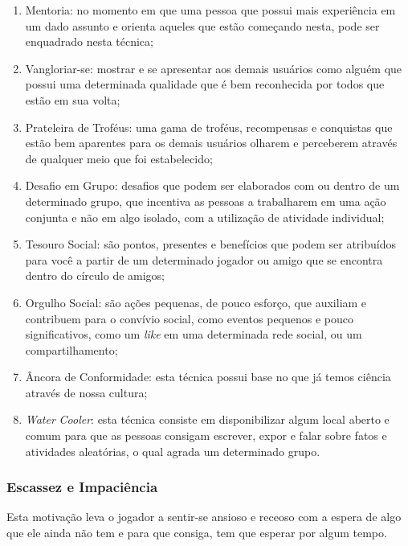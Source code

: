 \begin{enumerate}
    \item Mentoria: no momento em que uma pessoa que possui mais experiência
        em um dado assunto e orienta aqueles que estão começando nesta, pode
        ser enquadrado nesta técnica;
    \item Vangloriar-se: mostrar e se apresentar aos demais usuários como
        alguém que possui uma determinada qualidade que é bem reconhecida
        por todos que estão em sua volta;
    \item Prateleira de Troféus: uma gama de troféus, recompensas e conquistas
        que estão bem aparentes para os demais usuários olharem e perceberem
        através de qualquer meio que foi estabelecido;
    \item Desafio em Grupo: desafios que podem ser elaborados com ou dentro
        de um determinado grupo, que incentiva as pessoas a trabalharem
        em uma ação conjunta e não em algo isolado, com a utilização de atividade
        individual;
    \item Tesouro Social: são pontos, presentes e benefícios que podem ser atribuídos
        para você a partir de um determinado jogador ou amigo que se encontra dentro
        do círculo de amigos;
    \item Orgulho Social:  são ações pequenas, de pouco esforço, que auxiliam e contribuem
        para o convívio social, como eventos pequenos e pouco significativos,
        como um \textit{like} em uma determinada rede social, ou um compartilhamento;
    \item Âncora de Conformidade: esta técnica possui base no que já temos ciência
        através de nossa cultura;
    \item \textit{Water} \textit{Cooler}: esta técnica consiste em disponibilizar algum local
        aberto e comum para que as pessoas consigam escrever, expor e falar
        sobre fatos e atividades aleatórias, o qual agrada um determinado grupo.

\end{enumerate}

\subsubsection{Escassez e Impaciência}
\label{sub:escassexeimpaciencia}
Esta motivação leva o jogador a sentir-se ansioso e receoso com a espera de algo
que ele ainda não tem e para que consiga, tem que esperar por algum tempo.

